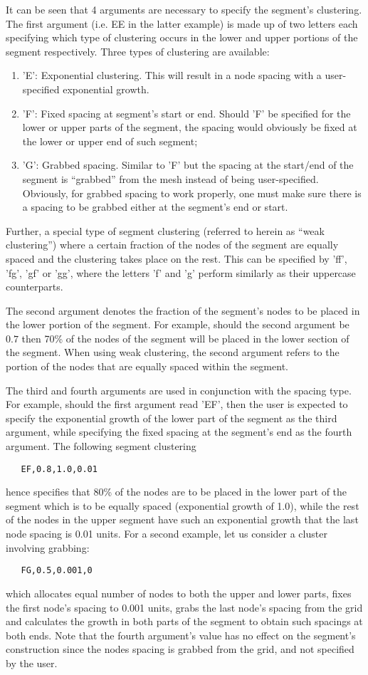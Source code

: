 \documentclass{warpdoc}
\begin{document}
It can be seen that 4 arguments are
necessary to specify the segment's clustering. The first argument
(i.e. EE in the latter example) is made up of two letters
each specifying which type of clustering
occurs in the lower and upper portions of the segment respectively.
Three types of clustering are available: 
\begin{enumerate}
\item
 'E': Exponential clustering.
  This will result in a node spacing with a user-specified exponential growth. 
\item 'F': Fixed spacing at segment's start or end. Should 'F' be specified for
the lower or upper parts of the segment, the spacing would obviously
be fixed at the lower or upper end of such segment; 
\item 'G': Grabbed spacing. Similar to 'F' but the spacing at the start/end of the segment
  is ``grabbed'' from the mesh instead of being user-specified. Obviously, for grabbed
spacing to work properly, one must make sure there is a spacing to be
grabbed either at the segment's end or start. 
\end{enumerate}
Further, a special type of segment
clustering (referred to herein as ``weak clustering'')
where a certain fraction of the nodes of the segment are
equally spaced and the clustering takes place on the rest. This can be specified by 
 'ff', 'fg', 'gf' or 'gg',
where the letters 'f' and 'g' perform similarly as their uppercase
counterparts. 

The second argument denotes the fraction of the segment's nodes
to be placed in the lower portion of the segment. For example,
should the second argument be $0.7$ then 70\% of the nodes of the segment
will be placed in the lower section of the segment. When using weak
clustering, the second argument refers to the portion of the nodes
that are equally spaced within the segment.

The third and fourth arguments are used in conjunction with the spacing
type. For example, should the first argument read 'EF', then the user
is expected to specify the exponential growth of the lower part
of the segment as the third argument, while specifying the fixed spacing
at the segment's end as the fourth argument. The following segment
clustering
%
\begin{verbatim}
   EF,0.8,1.0,0.01
\end{verbatim}
%
hence specifies that 80\% of the nodes are to be placed
in the lower part of the segment which is to be equally spaced
(exponential growth of 1.0), while the rest of the nodes in
the upper segment have such an exponential growth that the last
node spacing is 0.01 units. For a second example, let us consider
a cluster involving grabbing:
%
\begin{verbatim}
   FG,0.5,0.001,0
\end{verbatim}
%
which allocates equal number of nodes to both the upper and lower
parts, fixes the first node's spacing to 0.001 units, grabs the last
node's spacing from the grid and calculates the growth
in both parts of the segment to obtain such spacings at both ends.
Note that the fourth argument's value has no effect on the segment's
construction since the nodes spacing is grabbed from the grid, and not specified
by the user.
\end{document}
